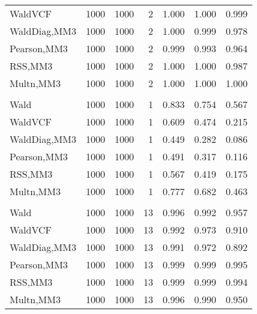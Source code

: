 \documentclass[
]{article}
\begin{document}
\begin{table}[H]
{\begin{tabular}[t]{lrrrrrr}
\hspace{1em}WaldVCF & 1000 & 1000 & 2 & 1.000 & 1.000 & 0.999\\
\hspace{1em}WaldDiag,MM3 & 1000 & 1000 & 2 & 1.000 & 0.999 & 0.978\\
\hspace{1em}Pearson,MM3 & 1000 & 1000 & 2 & 0.999 & 0.993 & 0.964\\
\hspace{1em}RSS,MM3 & 1000 & 1000 & 2 & 1.000 & 1.000 & 0.987\\
\hspace{1em}Multn,MM3 & 1000 & 1000 & 2 & 1.000 & 1.000 & 1.000\\
\addlinespace[0.3em]
\multicolumn{7}{l}{\textbf{2F 10V}}\\
\hspace{1em}Wald & 1000 & 1000 & 1 & 0.833 & 0.754 & 0.567\\
\hspace{1em}WaldVCF & 1000 & 1000 & 1 & 0.609 & 0.474 & 0.215\\
\hspace{1em}WaldDiag,MM3 & 1000 & 1000 & 1 & 0.449 & 0.282 & 0.086\\
\hspace{1em}Pearson,MM3 & 1000 & 1000 & 1 & 0.491 & 0.317 & 0.116\\
\hspace{1em}RSS,MM3 & 1000 & 1000 & 1 & 0.567 & 0.419 & 0.175\\
\hspace{1em}Multn,MM3 & 1000 & 1000 & 1 & 0.777 & 0.682 & 0.463\\
\addlinespace[0.3em]
\multicolumn{7}{l}{\textbf{3F 15V}}\\
\hspace{1em}Wald & 1000 & 1000 & 13 & 0.996 & 0.992 & 0.957\\
\hspace{1em}WaldVCF & 1000 & 1000 & 13 & 0.992 & 0.973 & 0.910\\
\hspace{1em}WaldDiag,MM3 & 1000 & 1000 & 13 & 0.991 & 0.972 & 0.892\\
\hspace{1em}Pearson,MM3 & 1000 & 1000 & 13 & 0.999 & 0.999 & 0.995\\
\hspace{1em}RSS,MM3 & 1000 & 1000 & 13 & 0.999 & 0.999 & 0.994\\
\hspace{1em}Multn,MM3 & 1000 & 1000 & 13 & 0.996 & 0.990 & 0.950\\
\bottomrule
\end{tabular}}
\endgroup{}
\end{table}
\end{document}
